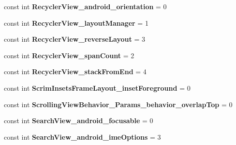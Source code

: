 \begin{DoxyCompactItemize}
const int {\bfseries Recycler\+View\+\_\+android\+\_\+orientation} = 0
\item 
\mbox{\label{class_sample_app_1_1_droid_1_1_resource_1_1_styleable_ae66f923eef0648f2eabb60bb30519e83}} 
const int {\bfseries Recycler\+View\+\_\+layout\+Manager} = 1
\item 
\mbox{\label{class_sample_app_1_1_droid_1_1_resource_1_1_styleable_aaa1c19205aa2dc891fff865b6274740c}} 
const int {\bfseries Recycler\+View\+\_\+reverse\+Layout} = 3
\item 
\mbox{\label{class_sample_app_1_1_droid_1_1_resource_1_1_styleable_a6126c92cddf73dfae06e4ffa8f4b4206}} 
const int {\bfseries Recycler\+View\+\_\+span\+Count} = 2
\item 
\mbox{\label{class_sample_app_1_1_droid_1_1_resource_1_1_styleable_ab46372e713b854c07fb8e5c3f209c27e}} 
const int {\bfseries Recycler\+View\+\_\+stack\+From\+End} = 4
\item 
\mbox{\label{class_sample_app_1_1_droid_1_1_resource_1_1_styleable_ac2abcd530a474e2b019fbbbbc9c321f3}} 
const int {\bfseries Scrim\+Insets\+Frame\+Layout\+\_\+inset\+Foreground} = 0
\item 
\mbox{\label{class_sample_app_1_1_droid_1_1_resource_1_1_styleable_acce24350874af743287aa60387faf9cb}} 
const int {\bfseries Scrolling\+View\+Behavior\+\_\+\+Params\+\_\+behavior\+\_\+overlap\+Top} = 0
\item 
\mbox{\label{class_sample_app_1_1_droid_1_1_resource_1_1_styleable_a34c434054492b29ea62def83eff32105}} 
const int {\bfseries Search\+View\+\_\+android\+\_\+focusable} = 0
\item 
\mbox{\label{class_sample_app_1_1_droid_1_1_resource_1_1_styleable_a51e267847746d17af74f6b203093b5c8}} 
const int {\bfseries Search\+View\+\_\+android\+\_\+ime\+Options} = 3

\end{DoxyCompactItemize}
